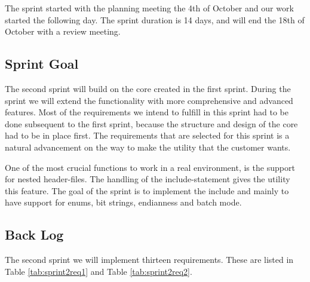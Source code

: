 The sprint started with the planning meeting the 4th of October and our work started the following day. The sprint duration is 14 days, and will end the 18th of October with a review meeting.  

\subsection{Sprint Goal}
The second sprint will build on the core created in the first sprint. During the sprint we will extend the functionality with more comprehensive and advanced features. Most of the requirements we intend to fulfill in this sprint had to be done subsequent to the first sprint, because the structure and design of the core had to be in place first. The requirements that are selected for this sprint is a natural advancement on the way to make the \gls{utility} that the customer wants. 

One of the most crucial functions to work in a real environment, is the support for nested \gls{header}-files. The handling of the \gls{include}-statement gives the \gls{utility} this feature. The goal of the sprint is to implement the \gls{include} and mainly to have support for \glspl{enum}, \glspl{bit string}, \gls{endianness} and \gls{batch mode}. 

\subsection{Back Log}
\label{sec:sp2backlog}
The second sprint we will implement thirteen requirements. These are listed in Table
\ref{tab:sprint2req1} and Table \ref{tab:sprint2req2}.

